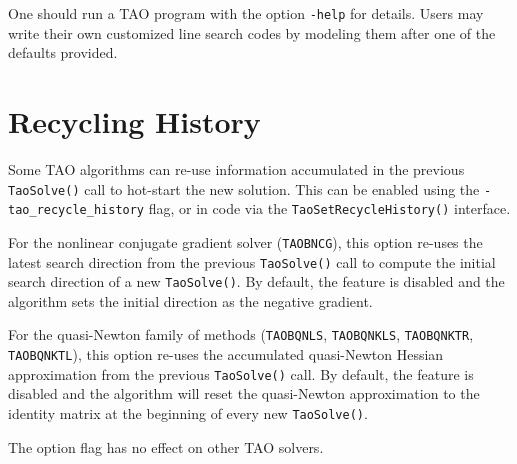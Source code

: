 One should run a TAO program with the option 
{\tt -help}
for details.  Users may write their own customized line search codes
by modeling them after one of the defaults provided.

\section{Recycling History} 
\label{sec_TaoRecycleHistory}

Some TAO algorithms can re-use information accumulated in the previous 
{\tt TaoSolve()} call to hot-start the new solution. This can be 
enabled using the {\tt -tao\_recycle\_history} flag, or in code via 
the {\tt TaoSetRecycleHistory()} interface.

For the nonlinear conjugate gradient solver ({\tt TAOBNCG}), this 
option re-uses the latest search direction from the previous 
{\tt TaoSolve()} call to compute the initial search direction of a 
new {\tt TaoSolve()}. By default, the feature is disabled and the 
algorithm sets the initial direction as the negative gradient.

For the quasi-Newton family of methods ({\tt TAOBQNLS}, {\tt TAOBQNKLS},
{\tt TAOBQNKTR}, {\tt TAOBQNKTL}), this option re-uses the accumulated 
quasi-Newton Hessian approximation from the previous {\tt TaoSolve()} call.
By default, the feature is disabled and the algorithm will reset the 
quasi-Newton approximation to the identity matrix at the beginning of 
every new {\tt TaoSolve()}.

The option flag has no effect on other TAO solvers.

